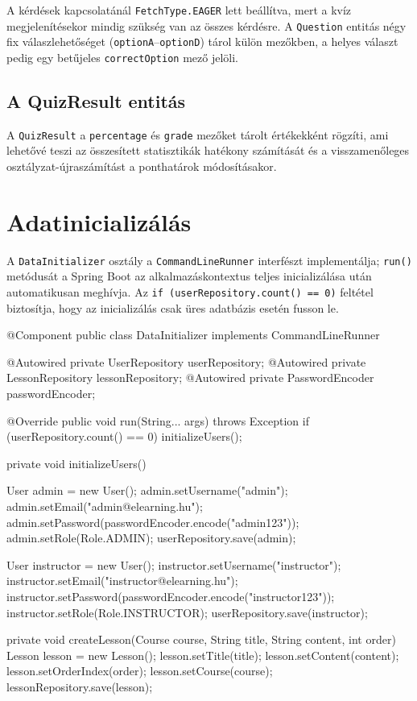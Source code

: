 A kérdések kapcsolatánál \texttt{FetchType.EAGER} lett beállítva, mert a kvíz megjelenítésekor mindig szükség van az összes kérdésre. A \texttt{Question} entitás négy fix válaszlehetőséget (\texttt{optionA}–\texttt{optionD}) tárol külön mezőkben, a helyes választ pedig egy betűjeles \texttt{correctOption} mező jelöli.

\subsection{A QuizResult entitás}

A \texttt{QuizResult} a \texttt{percentage} és \texttt{grade} mezőket tárolt értékekként rögzíti, ami lehetővé teszi az összesített statisztikák hatékony számítását és a visszamenőleges osztályzat-újraszámítást a ponthatárok módosításakor.

\section{Adatinicializálás}

A \texttt{DataInitializer} osztály a \texttt{CommandLineRunner} interfészt implementálja; \texttt{run()} metódusát a Spring Boot az alkalmazáskontextus teljes inicializálása után automatikusan meghívja. Az \texttt{if (userRepository.count() == 0)} feltétel biztosítja, hogy az inicializálás csak üres adatbázis esetén fusson le.

\begin{java}[caption={Adatinicializáló — tesztfelhasználók létrehozása},label=java:datainit]
@Component
public class DataInitializer implements CommandLineRunner {

    @Autowired private UserRepository   userRepository;
    @Autowired private LessonRepository lessonRepository;
    @Autowired private PasswordEncoder  passwordEncoder;

    @Override
    public void run(String... args) throws Exception {
        if (userRepository.count() == 0) {
            initializeUsers();
        }
    }

    private void initializeUsers() {
        User admin = new User();
        admin.setUsername("admin");
        admin.setEmail("admin@elearning.hu");
        admin.setPassword(passwordEncoder.encode("admin123"));
        admin.setRole(Role.ADMIN);
        userRepository.save(admin);

        User instructor = new User();
        instructor.setUsername("instructor");
        instructor.setEmail("instructor@elearning.hu");
        instructor.setPassword(passwordEncoder.encode("instructor123"));
        instructor.setRole(Role.INSTRUCTOR);
        userRepository.save(instructor);
    }

    private void createLesson(Course course, String title,
                               String content, int order) {
        Lesson lesson = new Lesson();
        lesson.setTitle(title);
        lesson.setContent(content);
        lesson.setOrderIndex(order);
        lesson.setCourse(course);
        lessonRepository.save(lesson);
    }
}
\end{java}

